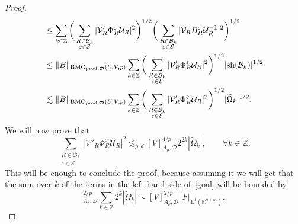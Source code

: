 \documentclass{article}
\theoremstyle{definition}
\theoremstyle{remark}
\numberwithin{equation}{section}
\newcommand{\cB}{\mathcal{B}}
\newcommand{\cE}{\mathcal{E}}
\newcommand{\cU}{\mathcal{U}}
\newcommand{\cV}{\mathcal{V}}
\newcommand{\bfD}{\bm{\mathcal{D}}}
\newcommand{\e}{\varepsilon}
\newcommand{\integer}{\mathbb{Z}}
\newcommand{\reals}{\mathbb{R}}
\newcommand{\Lp}[1]{\mathrm{L}^{#1}}
\newcommand{\1}{\mathbf{1}}
\newcommand{\BMOprodD}{\ensuremath\text{BMO}_{\text{prod},\bfD}}
\begin{document}
\begin{proof}
\begin{align*}
            &\leq\sum_{k\in\integer}\bigg(\sum_{\substack{R\in\cB_k\\\e\in\cE}}|\cV'_{R}\Phi_{R}^{\e}\cU_{R}|^2\bigg)^{1/2}\bigg(\sum_{\substack{R\in\cB_k\\\e\in\cE}}|\cV_{R}B_{R}^{\e}\cU_{R}^{-1}|^2\bigg)^{1/2}\\
            &\leq\Vert B\Vert_{\BMOprodD(U,V,p)}\sum_{k\in\integer}\bigg(\sum_{\substack{R\in\cB_k\\\e\in\cE}}|\cV'_{R}\Phi_{R}^{\e}\cU_{R}|^2\bigg)^{1/2}|\text{sh}(\cB_k)|^{1/2}\\
            &\lesssim\Vert B\Vert_{\BMOprodD(U,V,p)}\sum_{k\in\integer}\bigg(\sum_{\substack{R\in\cB_k\\\e\in\cE}}|\cV'_{R}\Phi_{R}^{\e}\cU_{R}|^2\bigg)^{1/2}|\widetilde{\Omega}_k|^{1/2}.
        \end{align*}
        We will now prove that
        \begin{equation}
            \label{goal}
            \sum_{\substack{R\in\cB_k\\\e\in\cE}}|\cV'_{R}\Phi_{R}^{\e}\cU_{R}|^2\lesssim_{p,d}[V]_{A_p,\bfD}^{4/p}2^{2k}|\widetilde{\Omega}_{k}|,\qquad\forall k\in\integer.
        \end{equation}
        This will be enough to conclude the proof, because assuming it we will get that the sum over $k$ of the terms in the left-hand side of~\eqref{goal} will be bounded by
        \begin{equation*}
            [V]_{A_p,\bfD}^{2/p}\sum_{k\in\integer}2^{k}|\widetilde{\Omega}_{k}|
            \sim[V]_{A_p,\bfD}^{2/p}\Vert F\Vert_{\Lp{1}(\reals^{n+m})}.
        \end{equation*}


\end{proof}
\end{document}
